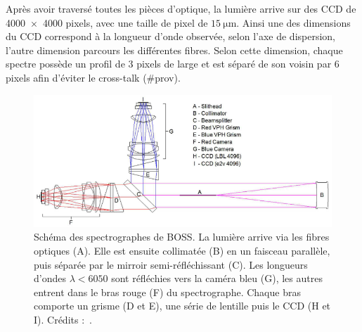Après avoir traversé toutes les pièces d'optique, la lumière arrive sur des CCD de \num{4000x4000} pixels, avec une taille de pixel de $\SI{15}{\micro\meter}$. Ainsi une des dimensions du CCD correspond à la longueur d'onde observée, selon l'axe de dispersion, l'autre dimension parcours les différentes fibres. Selon cette dimension, chaque spectre possède un profil de 3 pixels de large et  est séparé de son voisin par 6 pixels afin d'éviter le cross-talk (\#prov).
\begin{figure}
  \centering
  \includegraphics[scale=0.5]{SchemaSpectro}
  \caption{Schéma des spectrographes de BOSS. La lumière arrive via les fibres optiques (A). Elle est ensuite collimatée (B) en un faisceau parallèle, puis séparée par le mirroir semi-réfléchissant (C). Les longueurs d'ondes $\lambda < \num{6050}$ sont réfléchies vers la caméra bleu (G), les autres entrent dans le bras rouge (F) du spectrographe. Chaque bras comporte un grisme (D et E), une série de lentille puis le CCD (H et I). Crédits :~\cite{Smee2012}.}
  \label{fig:SchemaSpectro}
\end{figure}

